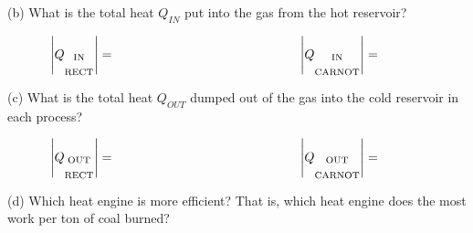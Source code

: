 (b)  What is the total heat $Q_{IN}$ put into the gas from the hot reservoir?

\begin{displaymath}
\hspace{-0.5in} \left| Q_{\substack{\textrm{IN} \\ \\ \textrm{RECT}}} \right| =
\hspace{2in} \left| Q_{\substack{\textrm{IN} \\ \\ \textrm{CARNOT}}} \right|=
\end{displaymath}


(c) What is the total heat $Q_{OUT}$ dumped out of the gas into the cold reservoir in each process?

\begin{displaymath}
\hspace{-0.5in} \left| Q_{\substack{\textrm{OUT} \\ \\ \textrm{RECT}}} \right| =
\hspace{2in} \left| Q_{\substack{\textrm{OUT} \\ \\ \textrm{CARNOT}}} \right|=
\end{displaymath}

(d)  Which heat engine is more efficient?  That is, which heat engine does the most work per ton of coal burned?





